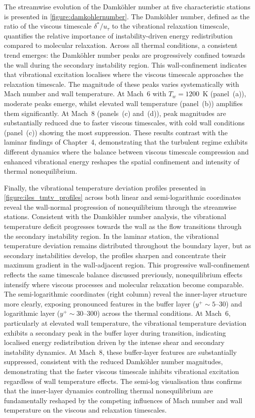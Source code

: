 The streamwise evolution of the Damk\"{o}hler number at five characteristic stations is presented in \ref{figure:damkohlernumber}. The Damk\"{o}hler number, defined as the ratio of the viscous timescale $\delta^{*}/u_{\tau}$ to the vibrational relaxation timescale, quantifies the relative importance of instability-driven energy redistribution compared to molecular relaxation. Across all thermal conditions, a consistent trend emerges: the Damk\"{o}hler number peaks are progressively confined towards the wall during the secondary instability region. This wall-confinement indicates that vibrational excitation localises where the viscous timescale approaches the relaxation timescale. The magnitude of these peaks varies systematically with Mach number and wall temperature. At Mach~6 with $T_w = 1200$~K (panel~(a)), moderate peaks emerge, whilst elevated wall temperature (panel~(b)) amplifies them significantly. At Mach~8 (panels~(c) and~(d)), peak magnitudes are substantially reduced due to faster viscous timescales, with cold wall conditions (panel~(c)) showing the most suppression. These results contrast with the laminar findings of Chapter~4, demonstrating that the turbulent regime exhibits different dynamics where the balance between viscous timescale compression and enhanced vibrational energy reshapes the spatial confinement and intensity of thermal nonequilibrium.


Finally, the vibrational temperature deviation profiles presented in \ref{figure:iles_tmtv_profiles} across both linear and semi-logarithmic coordinates reveal the wall-normal progression of nonequilibrium through the streamwise stations. Consistent with the Damköhler number analysis, the vibrational temperature deficit progresses towards the wall as the flow transitions through the secondary instability region. In the laminar station, the vibrational temperature deviation remains distributed throughout the boundary layer, but as secondary instabilities develop, the profiles sharpen and concentrate their maximum gradient in the wall-adjacent region. This progressive wall-confinement reflects the same timescale balance discussed previously, nonequilibrium effects intensify where viscous processes and molecular relaxation become comparable. The semi-logarithmic coordinates (right column) reveal the inner-layer structure more clearly, exposing pronounced features in the buffer layer ($y^+ \sim 5$--$30$) and logarithmic layer ($y^+ \sim 30$--$300$) across the thermal conditions. At Mach~6, particularly at elevated wall temperature, the vibrational temperature deviation exhibits a secondary peak in the buffer layer during transition, indicating localised energy redistribution driven by the intense shear and secondary instability dynamics. At Mach~8, these buffer-layer features are substantially suppressed, consistent with the reduced Damköhler number magnitudes, demonstrating that the faster viscous timescale inhibits vibrational excitation regardless of wall temperature effects. The semi-log visualisation thus confirms that the inner-layer dynamics controlling thermal nonequilibrium are fundamentally reshaped by the competing influences of Mach number and wall temperature on the viscous and relaxation timescales.




